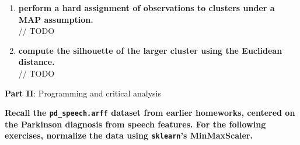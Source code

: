\documentclass[12pt]{article}
\begin{document}
\begin{enumerate}[leftmargin=\labelsep]
          \begin{enumerate}
              \item {\color{questioncolor}\bfseries
                    perform a hard assignment of observations to clusters under a
                    MAP assumption.
                    }\\
                    \vspace{0.5em}
                    // TODO
              \item {\color{questioncolor}\bfseries
                    compute the silhouette of the larger cluster using the
                    Euclidean distance.
                    }\\
                    \vspace{0.5em}
                    // TODO
          \end{enumerate}
\end{enumerate}

\pagebreak

\begin{center}
    \large{\textbf{Part II}: Programming and critical analysis}
\end{center}

{\color{questioncolor}\bfseries
\noindent
Recall the \texttt{pd\_speech.arff} dataset from earlier homeworks, centered on
the Parkinson diagnosis from speech features.
For the following exercises, normalize the data using \texttt{sklearn}'s
MinMaxScaler.
}
\end{document}
